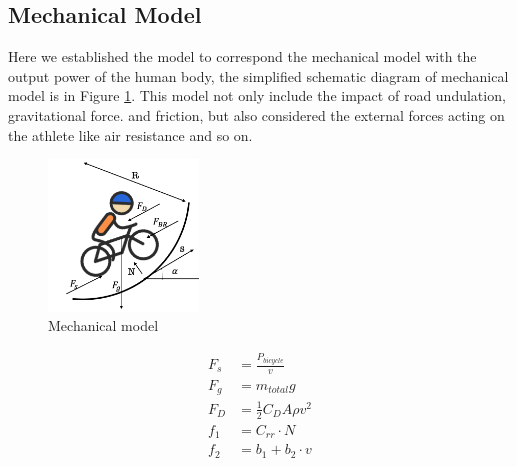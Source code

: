 \documentclass{mcmthesis}
\begin{document}


\par

\subsection{Mechanical Model}
Here we established the model to correspond the mechanical model with the output power of the human body, the simplified schematic diagram of mechanical model is in Figure \ref{fig:Mechanical model}. This model not only include the impact of road undulation,  gravitational force. and friction, but also considered the external forces acting on the athlete like air resistance and so on.
\begin{figure}[h]
\small
\centering
\includegraphics[width=4cm]{mcmthesis/figures/mechanical model.png}
\caption{Mechanical model} 
\label{fig:Mechanical model}
\end{figure}
\begin{align}
    F_s&=\frac{P_{bicycle}}{v}\\
    F_g&=m_{total}g\\
    F_D&=\frac{1}{2} C_DA\rho v^2\\
    f_1&=C_{rr}\cdot N\\
    f_2&=b_1+b_2\cdot v
\end{align}
\end{document}
